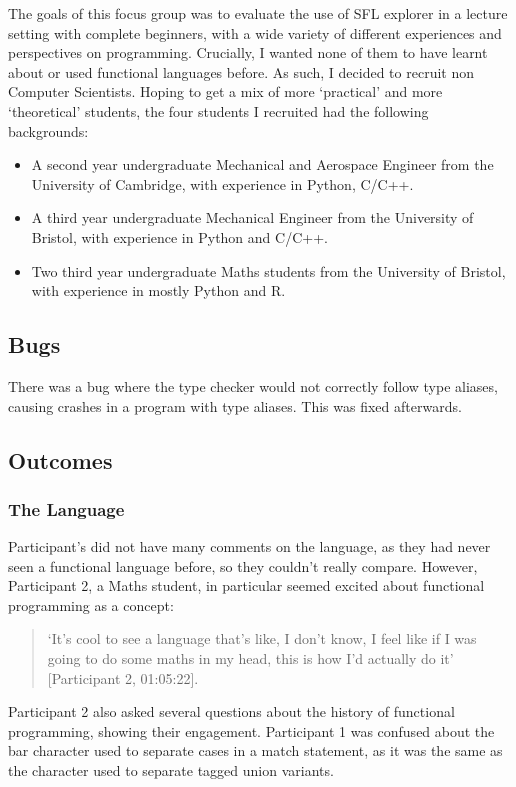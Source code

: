 The goals of this focus group was to evaluate the use of SFL explorer in a lecture setting with complete beginners, with a wide variety of different experiences and perspectives on programming. Crucially, I wanted none of them to have learnt about or used functional languages before. As such, I decided to recruit non Computer Scientists. Hoping to get a mix of more `practical' and more `theoretical' students, the four students I recruited had the following backgrounds:

\begin{itemize}
    \item A second year undergraduate Mechanical and Aerospace Engineer from the University of Cambridge, with experience in Python, C/C++.
    \item A third year undergraduate Mechanical Engineer from the University of Bristol, with experience in Python and C/C++.
    \item Two third year undergraduate Maths students from the University of Bristol, with experience in mostly Python and R.
\end{itemize}

\subsection{Bugs}
There was a bug where the type checker would not correctly follow type aliases, causing crashes in a program with type aliases. This was fixed afterwards. 

\subsection{Outcomes}

\subsubsection{The Language}
Participant's did not have many comments on the language, as they had never seen a functional language before, so they couldn't really compare. However, Participant 2, a Maths student, in particular seemed excited about functional programming as a concept:
\begin{quotation}
\noindent `It's cool to see a language that's like, I don't know, I feel like if I was going to do some maths in my head, this is how I'd actually do it' [Participant 2, 01:05:22]. 
\end{quotation}
\noindent Participant 2 also asked several questions about the history of functional programming, showing their engagement. Participant 1 was confused about the bar character used to separate cases in a match statement, as it was the same as the character used to separate tagged union variants. 

